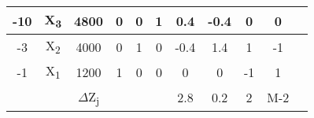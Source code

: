 \begin{table}[htp]
{\begin{tabular}{|c||c||c||c|c|c|c|c|c|c||c|}
	-10     & X\textsubscript{3} & 4800						  & 0	   & 0	 	& 1		& 0.4	& -0.4  & 0  	& 0		 & 			 \\ \hline
	-3      & X\textsubscript{2} & 4000 					  & 0	   & 1	  	& 0  	& -0.4	& 1.4	& 1		& -1	 & 			 \\ \hline
	-1      & X\textsubscript{1} & 1200   					  & 1	   & 0	    & 0	    & 0	    & 0	    & -1	& 1		 & 			 \\ \hline
	 		&    				 & $\Delta$Z\textsubscript{j} & 	   & 		& 		& 2.8   & 0.2   & 2	  	& M-2	 &		   	 \\ \hline\hline
	\end{tabular} 
	}
	\label{tab:q1}
\end{table}
